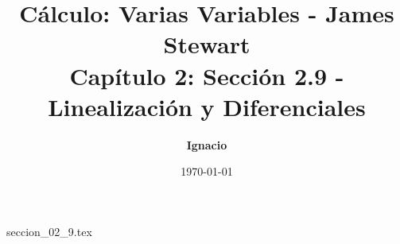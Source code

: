 \documentclass[11pt,spanish,oneside]{report}
\title{\textbf{Cálculo: Varias Variables - James Stewart} \\ \Large Capítulo 2: Sección 2.9 - Linealización y Diferenciales}
\author{\textbf{Ignacio}}
\date{\today}
\begin{document}
\maketitle

{seccion_02_9.tex}
\end{document}

